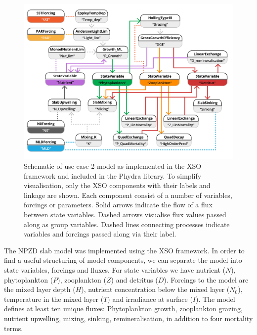 \documentclass[journal abbreviation, manuscript]{copernicus}
\begin{document}
\begin{figure}[t]
\includegraphics[width=15cm]{Figures/firstdraft_schematics/code_schematics/EMPOWER.pdf}
\caption{Schematic of use case 2 model as implemented in the XSO framework and included in the Phydra library. To simplify visualisation, only the XSO components with their labels and linkage are shown. Each component consist of a number of variables, forcings or parameters. Solid arrows indicate the flow of a flux between state variables. Dashed arrows visualise flux values passed along as group variables. Dashed lines connecting processes indicate variables and forcings passed along via their label.}
\label{Figure:CodeSchematics_2}
\end{figure}

The NPZD slab model was implemented using the XSO framework. In order to find a useful structuring of model components, we can separate the model into state variables, forcings and fluxes. For state variables we have nutrient ($N$), phytoplankton ($P$), zooplankton ($Z$) and detritus ($D$). Forcings to the model are the mixed layer depth ($H$), nutrient concentration below the mixed layer ($N_0$), temperature in the mixed layer ($T$) and irradiance at surface ($I$). The model defines at least ten unique fluxes: Phytoplankton growth, zooplankton grazing, nutrient upwelling, mixing, sinking, remineralisation, in addition to four mortality terms.
\end{document}
